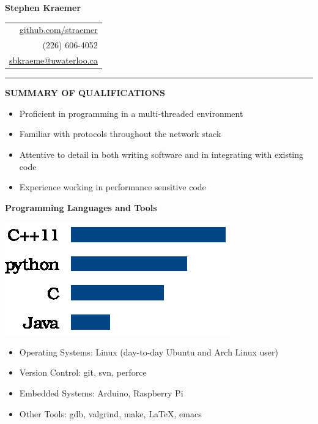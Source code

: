 \documentclass{letter}
\begin{document}
{\Huge\bf Stephen Kraemer} \hfill
\begin{tabular}{r}
  \href{https://github.com/straemer}{github.com/straemer} \\
  (226) 606-4052 \\
  \href{mailto:sbkraeme@uwaterloo.ca}{sbkraeme@uwaterloo.ca}
\end{tabular}

\vskip 2pt
\hrule

{\large\bf SUMMARY OF QUALIFICATIONS}
\begin{itemize}
  \item Proficient in programming in a multi-threaded environment
  \item Familiar with protocols throughout the network stack
  \item Attentive to detail in both writing software and in integrating with existing code
  \item Experience working in performance sensitive code
\end{itemize}

\vskip 2pt

{\bf Programming Languages and Tools}

\begin{minipage}{0.35\textwidth}
  \includegraphics{programming_languages.eps}
\end{minipage}
\begin{minipage}{0.65\textwidth}
  \begin{itemize}
    \item Operating Systems: Linux (day-to-day Ubuntu and Arch Linux user)
    \item Version Control: git, svn, perforce
    \item Embedded Systems: Arduino, Raspberry Pi
    \item Other Tools: gdb, valgrind, make, LaTeX, emacs
  \end{itemize}
\end{minipage}
\end{document}
